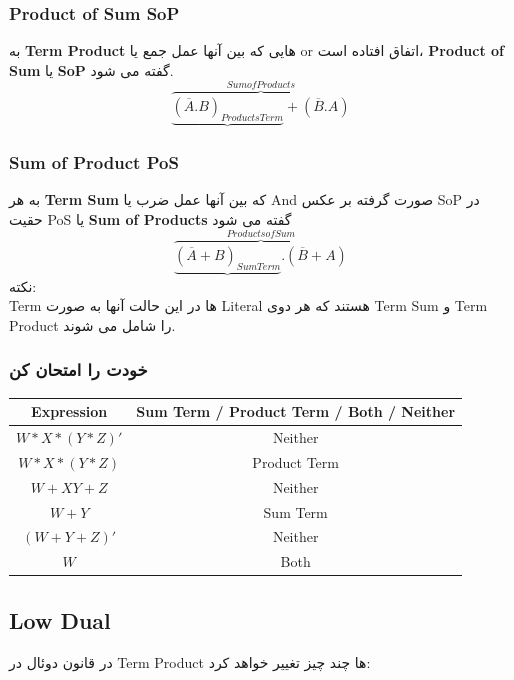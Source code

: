 \documentclass[20pt, a5paper]{article}
\begin{document}
\raggedleft
\justifying
\subsubsection{Product of Sum SoP}
	به \textbf{Term Product }هایی که بین آنها عمل جمع یا or اتفاق افتاده است، \textbf{Product of Sum }یا \textbf{SoP} گفته می شود.\\

\begin{equation}
	\overbrace{\underbrace{(\overline{A}.B)_{Products Term}} + (\overline{B}.A)}^{Sum of Products}
\end{equation}

\subsubsection{Sum of Product PoS}
	به هر \textbf{Term Sum} که بین آنها عمل ضرب یا And صورت گرفته بر عکس	 SoP در حقیت PoS یا\textbf{ Sum of Products }گفته می شود\\
\begin{equation}
	\overbrace{\underbrace{(\overline{A}+B)_{Sum Term}} . (\overline{B}+A)}^{Products of Sum}
\end{equation}
نکته:\\

	Term
ها
در این حالت آنها به صورت Literal هستند که هر دوی Term Sum و Term Product را شامل می شوند.

\newpage

\subsubsection{خودت را امتحان کن}
\center
\begin{LTR}
	\begin{tabular}{ c | c}
		Expression & Sum Term / Product Term / Both / Neither \\
		\hline
		$W*X*(Y*Z)'$ & Neither\\
		$W*X*(Y*Z)$ & Product Term\\
		$W+XY+Z$ & Neither\\
		$W+Y$ & Sum Term\\
		$(W+Y+Z)'$ & Neither\\
		$W$ & Both\\
	\end{tabular}

\end{LTR}

\raggedleft
\justifying
\subsection{Low Dual}
در قانون دوئال در Term Product ها چند چیز تغییر خواهد کرد:\\
\end{document}
